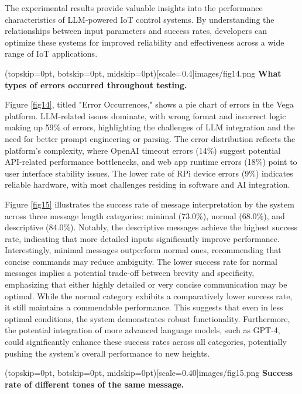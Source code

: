 \documentclass{ieeeaccess}
\begin{document}
The experimental results provide valuable insights into the performance characteristics of LLM-powered IoT control systems. By understanding the relationships between input parameters and success rates, developers can optimize these systems for improved reliability and effectiveness across a wide range of IoT applications. 

\Figure[t!](topskip=0pt, botskip=0pt,
midskip=0pt)[scale=0.4]{{images/fig14.png}}
{ \textbf{What types of errors occurred throughout testing.}\label{fig14}}

Figure \ref{fig14}, titled "Error Occurrences," shows a pie chart of errors in the Vega platform. LLM-related issues dominate, with wrong format and incorrect logic making up 59\% of errors, highlighting the challenges of LLM integration and the need for better prompt engineering or parsing. The error distribution reflects the platform's complexity, where OpenAI timeout errors (14\%) suggest potential API-related performance bottlenecks, and web app runtime errors (18\%) point to user interface stability issues. The lower rate of RPi device errors (9\%) indicates reliable hardware, with most challenges residing in software and AI integration.

Figure \ref{fig15} illustrates the success rate of message interpretation by the system across three message length categories: minimal (73.0\%), normal (68.0\%), and descriptive (84.0\%). Notably, the descriptive messages achieve the highest success rate, indicating that more detailed inputs significantly improve performance. Interestingly, minimal messages outperform normal ones, recommending that concise commands may reduce ambiguity. The lower success rate for normal messages implies a potential trade-off between brevity and specificity, emphasizing that either highly detailed or very concise communication may be optimal. While the normal category exhibits a comparatively lower success rate, it still maintains a commendable performance. This suggests that even in less optimal conditions, the system demonstrates robust functionality. Furthermore, the potential integration of more advanced language models, such as GPT-4, could significantly enhance these success rates across all categories, potentially pushing the system's overall performance to new heights.

\Figure[t!](topskip=0pt, botskip=0pt,
midskip=0pt)[scale=0.40]{{images/fig15.png}}
{ \textbf{Success rate of different tones of the same message.}\label{fig15}}
\end{document}
